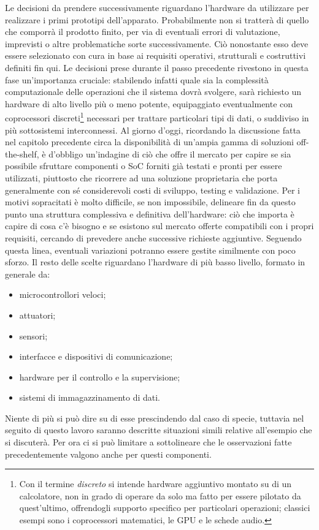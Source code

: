 \indent Le decisioni da prendere successivamente riguardano l'hardware da utilizzare per realizzare i primi prototipi dell'apparato. Probabilmente non si tratterà di quello che comporrà il prodotto finito, per via di eventuali errori di valutazione, imprevisti o altre problematiche sorte successivamente. Ciò nonostante esso deve essere selezionato con cura in base ai requisiti operativi, strutturali e costruttivi definiti fin qui. Le decisioni prese durante il passo precedente rivestono in questa fase un'importanza cruciale: stabilendo infatti quale sia la complessità computazionale delle operazioni che il sistema dovrà svolgere, sarà richiesto un hardware di alto livello più o meno potente, equipaggiato eventualmente con coprocessori discreti\footnote{Con il termine \emph{discreto} si intende hardware aggiuntivo montato su di un calcolatore, non in grado di operare da solo ma fatto per essere pilotato da quest'ultimo, offrendogli supporto specifico per particolari operazioni; classici esempi sono i coprocessori matematici, le GPU e le schede audio.} necessari per trattare particolari tipi di dati, o suddiviso in più sottosistemi interconnessi. Al giorno d'oggi, ricordando la discussione fatta nel capitolo precedente circa la disponibilità di un'ampia gamma di soluzioni off-the-shelf, è d'obbligo un'indagine di ciò che offre il mercato per capire se sia possibile sfruttare componenti o SoC forniti già testati e pronti per essere utilizzati, piuttosto che ricorrere ad una soluzione proprietaria che porta generalmente con sé considerevoli costi di sviluppo, testing e validazione. Per i motivi sopracitati è molto difficile, se non impossibile, delineare fin da questo punto una struttura complessiva e definitiva dell'hardware: ciò che importa è capire di cosa c'è bisogno e se esistono sul mercato offerte compatibili con i propri requisiti, cercando di prevedere anche successive richieste aggiuntive. Seguendo questa linea, eventuali variazioni potranno essere gestite similmente con poco sforzo.\newpage
Il resto delle scelte riguardano l'hardware di più basso livello, formato in generale da:
\begin{itemize}
    \item microcontrollori veloci;
    \item attuatori;
    \item sensori;
    \item interfacce e dispositivi di comunicazione;
    \item hardware per il controllo e la supervisione;
    \item sistemi di immagazzinamento di dati.
\end{itemize}
Niente di più si può dire su di esse prescindendo dal caso di specie, tuttavia nel seguito di questo lavoro saranno descritte situazioni simili relative all'esempio che si discuterà. Per ora ci si può limitare a sottolineare che le osservazioni fatte precedentemente valgono anche per questi componenti.

